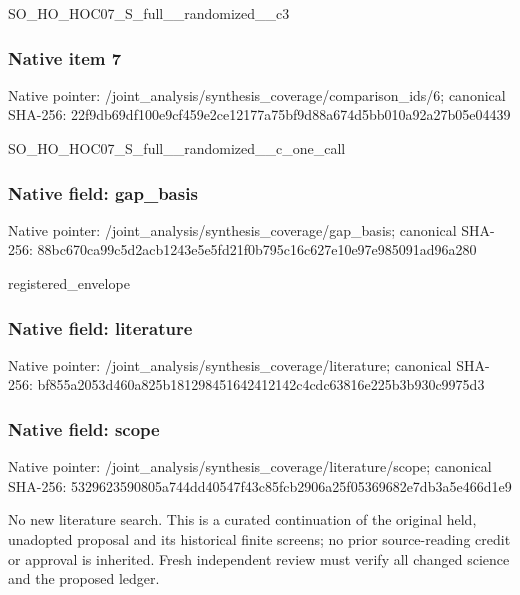 \documentclass[10pt,a4paper]{article}
\begin{document}
\begingroup\raggedright\sloppy SO\_\allowbreak{}HO\_\allowbreak{}HOC07\_\allowbreak{}S\_\allowbreak{}full\_\allowbreak{}\_\allowbreak{}randomized\_\allowbreak{}\_\allowbreak{}c3\par\endgroup

\subsubsection{Native item 7}
Native pointer: /joint\_\allowbreak{}analysis/synthesis\_\allowbreak{}coverage/comparison\_\allowbreak{}ids/6; canonical SHA-256: 22f9db69df100e9cf459e2ce12177a75bf9d88a674d5bb010a92a27b05e04439

\begingroup\raggedright\sloppy SO\_\allowbreak{}HO\_\allowbreak{}HOC07\_\allowbreak{}S\_\allowbreak{}full\_\allowbreak{}\_\allowbreak{}randomized\_\allowbreak{}\_\allowbreak{}c\_\allowbreak{}one\_\allowbreak{}call\par\endgroup

\subsubsection{Native field: gap\_\allowbreak{}basis}
Native pointer: /joint\_\allowbreak{}analysis/synthesis\_\allowbreak{}coverage/gap\_\allowbreak{}basis; canonical SHA-256: 88bc670ca99c5d2acb1243e5e5fd21f0b795c16c627e10e97e985091ad96a280

\begingroup\raggedright\sloppy registered\_\allowbreak{}envelope\par\endgroup

\subsubsection{Native field: literature}
Native pointer: /joint\_\allowbreak{}analysis/synthesis\_\allowbreak{}coverage/literature; canonical SHA-256: bf855a2053d460a825b181298451642412142c4cdc63816e225b3b930c9975d3

\subsubsection{Native field: scope}
Native pointer: /joint\_\allowbreak{}analysis/synthesis\_\allowbreak{}coverage/literature/scope; canonical SHA-256: 5329623590805a744dd40547f43c85fcb2906a25f05369682e7db3a5e466d1e9

\begingroup\raggedright\sloppy No new literature search. This is a curated continuation of the original held,\allowbreak{} unadopted proposal and its historical finite screens;\allowbreak{} no prior source-reading credit or approval is inherited. Fresh independent review must verify all changed science and the proposed ledger.\par\endgroup
\end{document}
